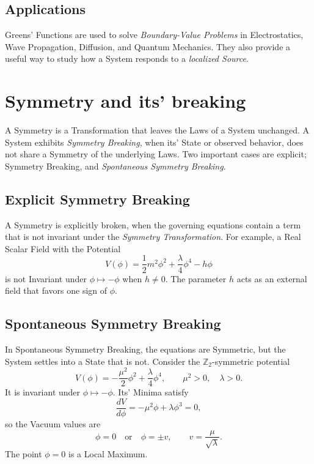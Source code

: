 \documentclass[a4paper, 10pt, onepage]{elegantbook}
\begin{document}
\subsection{Applications}

Greens' Functions are used to solve \emph{Boundary-Value Problems} in Electrostatics, Wave Propagation, Diffusion, and Quantum Mechanics. They also provide a useful way to study how a System responds to a \emph{localized Source}.



\section{Symmetry and its' breaking}

A Symmetry is a Transformation that leaves the Laws of a System unchanged. A System exhibits \emph{Symmetry Breaking}, when its' State or observed behavior, does not share a Symmetry of the underlying Laws. Two important cases are explicit; Symmetry Breaking, and \emph{Spontaneous Symmetry Breaking}.

\subsection{Explicit Symmetry Breaking}

A Symmetry is explicitly broken, when the governing equations contain a term that is not invariant under the \emph{Symmetry Transformation}. For example, a Real Scalar Field with the Potential
\[
V(\phi)=\frac{1}{2}m^2\phi^2+\frac{\lambda}{4}\phi^4-h\phi
\]
is not Invariant under \(\phi\mapsto-\phi\) when \(h\ne 0\). The parameter \(h\) acts as an external field that favors one sign of
\(\phi\).

\subsection{Spontaneous Symmetry Breaking}

In Spontaneous Symmetry Breaking, the equations are Symmetric, but the System settles into a State that is not. Consider the
\(\mathbb{Z}_2\)-symmetric potential
\[
V(\phi)=-\frac{\mu^2}{2}\phi^2+\frac{\lambda}{4}\phi^4,
\qquad \mu^2>0,\quad \lambda>0.
\]
It is invariant under \(\phi\mapsto-\phi\). Its' Minima satisfy
\[
\frac{dV}{d\phi}=-\mu^2\phi+\lambda\phi^3=0,
\]
so the Vacuum values are
\[
\phi=0
\quad\text{or}\quad
\phi=\pm v,
\qquad
v=\frac{\mu}{\sqrt{\lambda}}.
\]
The point \(\phi=0\) is a Local Maximum.
\end{document}
